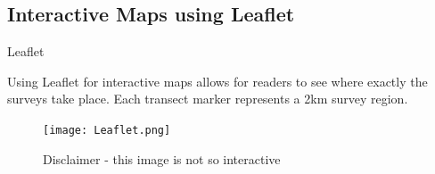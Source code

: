 \documentclass{beamer}
\begin{document}
             \subsection{Interactive Maps using Leaflet}
                 \begin{frame}{Leaflet}

                    Using Leaflet\footnotemark {} for interactive maps allows for readers to see where exactly the surveys take place. Each transect marker represents a 2km survey region.

                     \begin{figure}
                        \centering
                        \texttt{[image: Leaflet.png]}
                        \caption{Disclaimer - this image is not so interactive }
                     \end{figure}
                 \end{frame}
\end{document}
